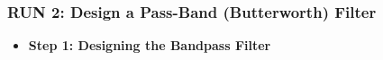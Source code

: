 \documentclass[11pt]{article}
\providecommand{\tightlist}{%
      \setlength{\itemsep}{0pt}\setlength{\parskip}{0pt}}
\begin{document}
    \begin{center}
    \end{center}
    { \hspace*{\fill} \\}
    
    \hypertarget{run-2-design-a-pass-band-butterworth-filter}{%
\subsubsection{RUN 2: Design a Pass-Band (Butterworth)
Filter}\label{run-2-design-a-pass-band-butterworth-filter}}

\begin{itemize}
\tightlist
\item
  \textbf{Step 1: Designing the Bandpass Filter}
\end{itemize}
\end{document}
